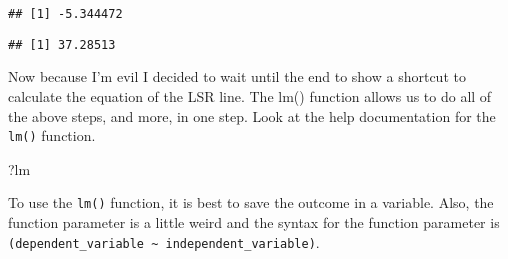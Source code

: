 \documentclass[]{book}
\newenvironment{Shaded}{\begin{snugshade}}{\end{snugshade}}
\newcommand{\KeywordTok}[1]{\textcolor[rgb]{0.13,0.29,0.53}{\textbf{#1}}}
\newcommand{\DataTypeTok}[1]{\textcolor[rgb]{0.13,0.29,0.53}{#1}}
\newcommand{\StringTok}[1]{\textcolor[rgb]{0.31,0.60,0.02}{#1}}
\newcommand{\CommentTok}[1]{\textcolor[rgb]{0.56,0.35,0.01}{\textit{#1}}}
\newcommand{\OperatorTok}[1]{\textcolor[rgb]{0.81,0.36,0.00}{\textbf{#1}}}
\newcommand{\NormalTok}[1]{#1}
\begin{document}
\begin{Shaded}
\end{Shaded}

\begin{verbatim}
## [1] -5.344472
\end{verbatim}

\begin{Shaded}
\end{Shaded}

\begin{verbatim}
## [1] 37.28513
\end{verbatim}

Now because I'm evil I decided to wait until the end to show a shortcut
to calculate the equation of the LSR line. The lm() function allows us
to do all of the above steps, and more, in one step. Look at the help
documentation for the \texttt{lm()} function.

\begin{Shaded}
\begin{Highlighting}[]
\NormalTok{?lm}
\end{Highlighting}
\end{Shaded}

To use the \texttt{lm()} function, it is best to save the outcome in a
variable. Also, the function parameter is a little weird and the syntax
for the function parameter is
\texttt{(dependent\_variable\ \textasciitilde{}\ independent\_variable)}.
\end{document}
